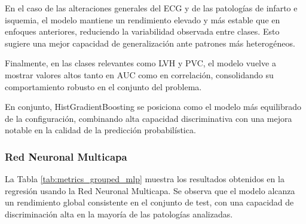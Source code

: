 \documentclass[12pt,a4paper,twoside]{book}
\begin{document}
En el caso de las alteraciones generales del ECG y de las patologías de infarto e isquemia, el modelo mantiene un rendimiento elevado y más estable que en enfoques anteriores, reduciendo la variabilidad observada entre clases. 
Esto sugiere una mejor capacidad de generalización ante patrones más heterogéneos.

Finalmente, en las clases relevantes como LVH y PVC, el modelo vuelve a mostrar valores altos tanto en AUC como en correlación, consolidando su comportamiento robusto en el conjunto del problema.

En conjunto, HistGradientBoosting se posiciona como el modelo más equilibrado de la configuración, combinando alta capacidad discriminativa con una mejora notable en la calidad de la predicción probabilística.

\subsubsection*{Red Neuronal Multicapa}

La Tabla \ref{tab:metrics_grouped_mlp} muestra los resultados obtenidos en la regresión usando la Red Neuronal Multicapa.
Se observa que el modelo alcanza un rendimiento global consistente en el conjunto de test, con una capacidad de discriminación alta en la mayoría de las patologías analizadas.
\end{document}
